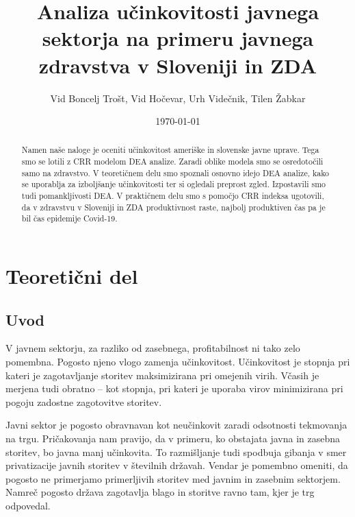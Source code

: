 \documentclass[12pt,a4paper]{article}
\theoremstyle{definition}
\begin{document}
\setlength{\parskip}{1em}
\setlength{\parindent}{0pt}

\title{Analiza učinkovitosti javnega sektorja na primeru javnega zdravstva v Sloveniji in ZDA}
\author{Vid Boncelj Trošt, Vid Hočevar, Urh Videčnik, Tilen Žabkar}
\date{\today}
\maketitle

\begin{abstract}
    Namen naše naloge je oceniti učinkovitost ameriške in slovenske javne
    uprave. Tega smo se lotili z CRR modelom DEA analize. Zaradi oblike modela
    smo se osredotočili samo na zdravstvo. V teoretičnem
    delu smo spoznali osnovno idejo DEA analize, kako se uporablja za 
    izboljšanje učinkovitosti ter si ogledali preprost zgled. Izpostavili
    smo tudi pomankljivosti DEA. V praktičnem delu smo s pomočjo CRR indeksa
    ugotovili, da v zdravstvu v Sloveniji in ZDA produktivnost raste, najbolj
    produktiven čas pa je bil čas epidemije Covid-19. 
\end{abstract}

\newpage

\tableofcontents

\section{Teoretični del}

\subsection{Uvod}

V javnem sektorju, za razliko od zasebnega, profitabilnost
ni tako zelo pomembna. Pogosto njeno vlogo zamenja učinkovitost. 
Učinkovitost je stopnja pri kateri je zagotavljanje storitev maksimizirana pri omejenih 
virih. Včasih je merjena tudi obratno -- kot stopnja, pri kateri je uporaba virov 
minimizirana pri pogoju zadostne zagotovitve storitev. 

Javni sektor je pogosto obravnavan kot neučinkovit zaradi odsotnosti
tekmovanja na trgu. Pričakovanja nam pravijo, da v primeru, ko obstajata
javna in zasebna storitev, bo javna manj učinkovita. To razmišljanje tudi
spodbuja gibanja v smer privatizacije javnih storitev v številnih državah.
Vendar je pomembno omeniti, da pogosto ne primerjamo primerljivih
storitev med javnim in zasebnim sektorjem. Namreč 
pogosto država zagotavlja blago in storitve ravno tam, kjer je trg odpovedal.
\cite{Lovell2002}
\end{document}
